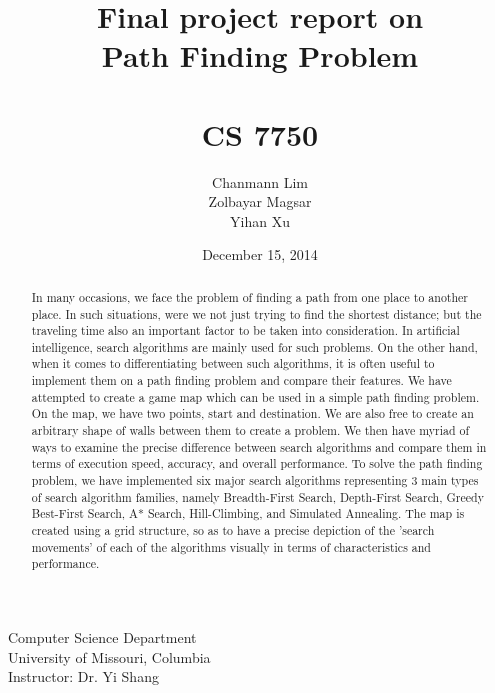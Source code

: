 \documentclass[a4paper]{article}
\title{Final project report on \\Path Finding Problem \\~ \\ CS 7750} %
\author{Chanmann Lim \\Zolbayar Magsar \\Yihan Xu}
\date{December 15, 2014}
\begin{document}
\maketitle %

\lstset{language=Java,title=\lstname,basicstyle=\footnotesize}

\begin{center}
Computer Science Department \\
University of Missouri, Columbia \\
\vspace{.5 in}
Instructor: Dr. Yi Shang \\
\end{center}

\vspace{1 in}

\begin{abstract}
In many occasions, we face the problem of finding a path from one place to another place. In such situations, were we not just trying to find the shortest distance; but the traveling time also an important factor to be taken into consideration. In artificial intelligence, search algorithms are mainly used for such problems. On the other hand, when it comes to differentiating between such algorithms, it is often useful to implement them on a path finding problem and compare their features. We have attempted to create a game map which can be used in a simple path finding problem. On the map, we have two points, start and destination. We are also free to create an arbitrary shape of walls between them to create a problem. We then have myriad of ways to examine the precise difference between search algorithms and compare them in terms of execution speed, accuracy, and overall performance. To solve the path finding problem, we have implemented six major search algorithms representing 3 main types of search algorithm families, namely Breadth-First Search, Depth-First Search, Greedy Best-First Search, A* Search, Hill-Climbing, and Simulated Annealing. The map is created using a grid structure, so as to have a precise depiction of the 'search movements' of each of the algorithms visually in terms of characteristics and performance.
\end{abstract}


\end{document}
